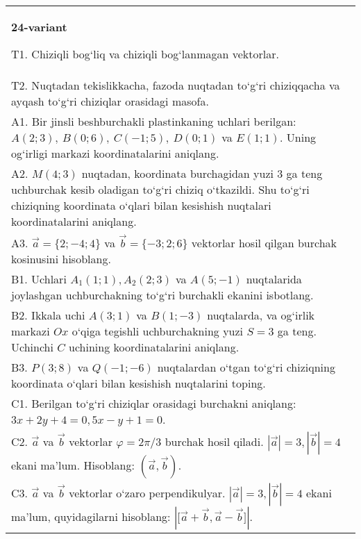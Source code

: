 \documentclass{article}
\begin{document}
\begin{tabular}{m{17cm}}
\textbf{24-variant}

T1. 
Chiziqli bog‘liq va chiziqli bog‘lanmagan vektorlar.
 \\
T2. 
Nuqtadan tekislikkacha, fazoda nuqtadan to‘g‘ri chiziqqacha va ayqash to‘g‘ri chiziqlar orasidagi masofa.
 \\
A1. 
Bir jinsli beshburchakli plastinkaning uchlari berilgan:
$A (2;3), \ B (0;6), \ C (-1;5), \ D (0;1) $ va $E (1;1) $. Uning og‘irligi
markazi koordinatalarini aniqlang.
 \\
A2. 
$M (4;3) $ nuqtadan, koordinata burchagidan
yuzi 3 ga teng uchburchak kesib oladigan to‘g‘ri chiziq o‘tkazildi.
Shu to‘g‘ri chiziqning koordinata o‘qlari bilan kesishish nuqtalari
koordinatalarini aniqlang.
 \\
A3. 
$\overrightarrow{a} = \{ 2; - 4;4\}$ va $\overrightarrow{b} = \{ - 3;2;6\}$
vektorlar hosil qilgan burchak kosinusini hisoblang.
 \\
B1. 
Uchlari $A_1 (1; 1), A_2 (2; 3) $ va $A (5;-1) $
nuqtalarida joylashgan uchburchakning to‘g‘ri burchakli ekanini isbotlang.
 \\
B2. 
Ikkala uchi \(A (3;1) \) va \(B (1;-3) \) nuqtalarda, va
og‘irlik markazi $Ox$ o‘qiga tegishli uchburchakning yuzi
\(S=3\) ga teng. Uchinchi $C$ uchining koordinatalarini aniqlang.
 \\
B3. 
\(P (3;8) \) va \(Q (-1;-6) \) nuqtalardan o‘tgan
to‘g‘ri chiziqning koordinata o‘qlari bilan kesishish nuqtalarini toping.
 \\
C1. 
Berilgan to‘g‘ri chiziqlar orasidagi burchakni aniqlang: $3x+2y+4=0, 5x-y+1=0$.
 \\
C2. 
$\vec{a}$ va $\vec{b}$ vektorlar $\varphi = 2\pi/3$ burchak hosil qiladi. $|\vec{a}| = 3,|\vec{b}| = 4$ ekani ma’lum. Hisoblang:
$\left(\vec{a},\vec{b} \right) $.
 \\
C3. 
$\vec{a}$ va $\vec{b}$ vektorlar o‘zaro perpendikulyar. $|\vec{a}| = 3,|\vec{b}| = 4$ ekani ma’lum, quyidagilarni hisoblang:
$|\lbrack\vec{a} + \vec{b},\vec{a} - \vec{b}\rbrack|$.
 \\

\end{tabular}
\vspace{1cm}
\end{document}
